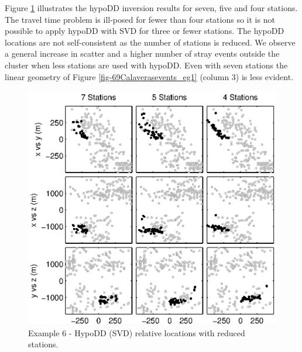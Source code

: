 \documentclass[extra, onecolumn, doublespacing]{gji}
\begin{document}
Figure \ref{fig-HYPODDreducesstats} illustrates the hypoDD inversion
results for seven, five and four stations. The travel time problem
is ill-posed for fewer than four stations so it is not possible to
apply hypoDD with SVD for three or fewer stations.  The hypoDD
locations are not self-consistent as the number of stations is
reduced. We observe a general increase in scatter and a higher
number of stray events outside the cluster when less stations are
used with hypoDD. Even with seven stations the linear geometry of
Figure \ref{fig-69Calaverasevents_eg1} (column 3) is less evident.


\begin{figure}
\includegraphics[height = 25pc]{diags/CalaverasLoc3_hypoDD_SVD.eps}
\caption{Example 6 - HypoDD (SVD) relative locations with reduced
stations.} \label{fig-HYPODDreducesstats}
\end{figure}
\end{document}
